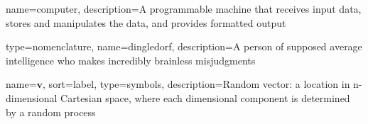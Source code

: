 {
name=computer,
description={A programmable machine that receives input data,
               stores and manipulates the data, and provides
               formatted output}
}

{
type=nomenclature,
name=dingledorf,
description={A person of supposed average intelligence who makes incredibly brainless misjudgments}
}


{
name={$\mathbf{v}$},
sort={label},
type=symbols,
description={Random vector: a location in n-dimensional Cartesian space, where each dimensional component is determined by a random process}
}


